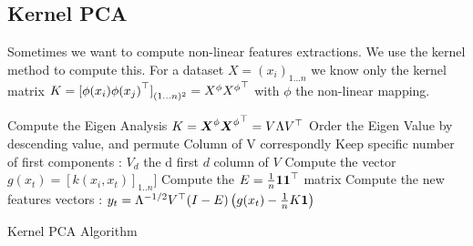 	

	\subsection{Kernel PCA} %
		\label{sub:kernel_pca}
	
		Sometimes we want to compute non-linear features extractions. We use the kernel method to compute this. For a dataset $X = (x_i)_{1...n}$ we know only the kernel
		 matrix $K = {[\phi(x_i) {\phi(x_j)} ^\top]}_{(1...n)^2} = X^{\phi} {X^{\phi}} ^\top $ with $\phi$ the non-linear mapping.

		\begin{algorithm}[H]
				Compute the Eigen Analysis $K = {\boldsymbol{{X}}}^{\phi} {{\boldsymbol{{X}}}^{\phi}} ^\top = V \Lambda {V }^\top$ \;
				Order the Eigen Value by descending value, and permute Column of V correspondly\;
				Keep specific number of first components : $V_d$ the d first $d$ column of $V$ \;
				Compute the vector $g(x_t) = [k(x_i, x_t)]_{1..n}]$ \;
				Compute the $E = \frac{1}{n}{\boldsymbol{{1}}} {\boldsymbol{{1}}} ^\top $ matrix \;
				Compute the new features vectors : $y_t = \Lambda^{-1/2} V ^\top (I - E)\left( g(x_t)-\frac{1}{n} K {\boldsymbol{{1}}} \right)$ 
				\caption{Kernel PCA Algorithm}
			\end{algorithm}
	
